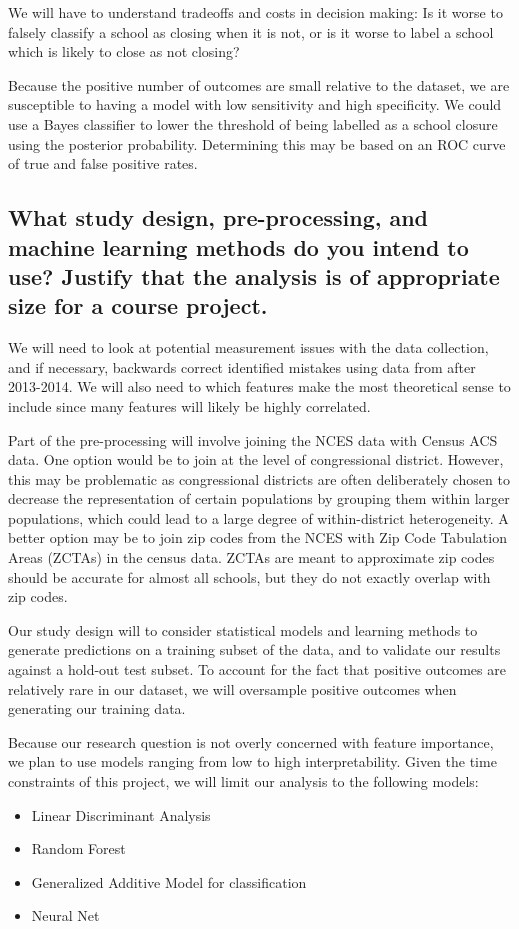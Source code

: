 \documentclass[twoside,11pt]{article}
\begin{document}
We will have to understand tradeoffs and costs in decision making:  Is it worse to falsely classify a school as closing when it is not, or is it worse to label a school which is likely to close as not closing?

Because the positive number of outcomes are small relative to the dataset, we are susceptible to having a model with low sensitivity and high specificity.  We could use a Bayes classifier to lower the threshold of being labelled as a school closure using the posterior probability.  Determining this may be based on an ROC curve of true and false positive rates.  


\subsection{What study design, pre-processing, and machine learning methods do you intend to use? Justify that the analysis is of appropriate size for a course project.}

We will need to look at potential measurement issues with the data collection, and if necessary, backwards correct identified mistakes using data from after 2013-2014. We will also need to which features make the most theoretical sense to include since many features will likely be highly correlated.

Part of the pre-processing will involve joining the NCES data with Census ACS data. One option would be to join at the level of congressional district. However, this may be problematic as congressional districts are often deliberately chosen to decrease the representation of certain populations by grouping them within larger populations, which could lead to a large degree of within-district heterogeneity. A better option may be to join zip codes from the NCES with Zip Code Tabulation Areas (ZCTAs) in the census data. ZCTAs are meant to approximate zip codes should be accurate for almost all schools, but they do not exactly overlap with zip codes. 

Our study design will to consider statistical models and learning methods to generate predictions on a training subset of the data, and to validate our results against a hold-out test subset. To account for the fact that positive outcomes are relatively rare in our dataset, we will oversample positive outcomes when generating our training data.

Because our research question is not overly concerned with feature importance, we plan to use models ranging from low to high interpretability. Given the time constraints of this project, we will limit our analysis to the following models:
\begin{itemize}
    \item Linear Discriminant Analysis
    \item Random Forest
    \item Generalized Additive Model for classification
    \item Neural Net
\end{itemize}
\end{document}
